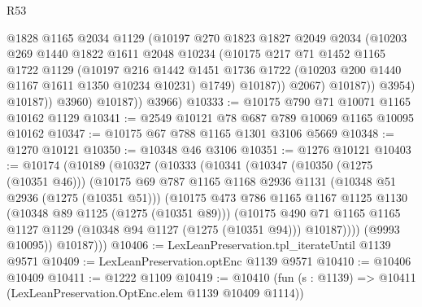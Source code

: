 \begin{lexlean}{R53}
\begin{coremodule}
                      @1828
                      @1165
                      @2034
                      @1129
                      (@10197
                        @270
                        @1823
                        @1827
                        @2049
                        @2034
                        (@10203
                          @269
                          @1440
                          @1822
                          @1611
                          @2048
                          @10234
                          (@10175
                            @217
                            @71
                            @1452
                            @1165
                            @1722
                            @1129
                            (@10197
                              @216
                              @1442
                              @1451
                              @1736
                              @1722
                              (@10203 @200 @1440 @1167 @1611 @1350 @10234 @10231)
                              @1749)
                            @10187))
                        @2067)
                      @10187))
                  @3954)
                @10187))
            @3960)
          @10187))
      @3966)
@10333 := @10175 @790 @71 @10071 @1165 @10162 @1129
@10341 := @2549 @10121 @78 @687 @789 @10069 @1165 @10095 @10162
@10347 := @10175 @67 @788 @1165 @1301 @3106 @5669
@10348 := @1270 @10121
@10350 := @10348 @46 @3106
@10351 := @1276 @10121
@10403 := @10174
    (@10189
      (@10327
        (@10333
          (@10341
            (@10347
              (@10350 (@1275 (@10351 @46)))
              (@10175
                @69
                @787
                @1165
                @1168
                @2936
                @1131
                (@10348 @51 @2936 (@1275 (@10351 @51)))
                (@10175
                  @473
                  @786
                  @1165
                  @1167
                  @1125
                  @1130
                  (@10348 @89 @1125 (@1275 (@10351 @89)))
                  (@10175
                    @490
                    @71
                    @1165
                    @1165
                    @1127
                    @1129
                    (@10348 @94 @1127 (@1275 (@10351 @94)))
                    @10187))))
            (@9993 @10095))
          @10187)))
@10406 := LexLeanPreservation.tpl_iterateUntil @1139 @9571
@10409 := LexLeanPreservation.optEnc @1139 @9571
@10410 := @10406 @10409
@10411 := @1222 @1109
@10419 := @10410
    (fun (s : @1139) => @10411 (LexLeanPreservation.OptEnc.elem @1139 @10409 @1114))

\end{coremodule}
\end{lexlean}
